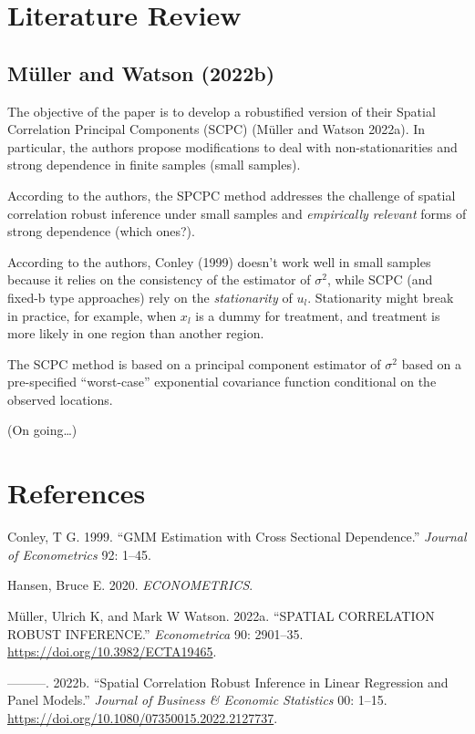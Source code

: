 \documentclass[
]{article}
\newlength{\cslhangindent}
\newlength{\cslentryspacingunit} %
\newenvironment{CSLReferences}[2] %
 {%
  \setlength{\parindent}{0pt}
  \ifodd #1
  \let\oldpar\par
  \def\par{\hangindent=\cslhangindent\oldpar}
  \fi
  \setlength{\parskip}{#2\cslentryspacingunit}
 }%
 {}
\begin{document}
\hypertarget{literature-review}{%
\section{Literature Review}\label{literature-review}}

\hypertarget{muller2022jbes}{%
\subsection{Müller and Watson (2022b)}\label{muller2022jbes}}

The objective of the paper is to develop a robustified version of their
Spatial Correlation Principal Components (SCPC) (Müller and Watson
2022a). In particular, the authors propose modifications to deal with
non-stationarities and strong dependence in finite samples (small
samples).

According to the authors, the SPCPC method addresses the challenge of
spatial correlation robust inference under small samples and
\emph{empirically relevant} forms of strong dependence (which ones?).

According to the authors, Conley (1999) doesn't work well in small
samples because it relies on the consistency of the estimator of
\(\sigma^2\), while SCPC (and fixed-b type approaches) rely on the
\emph{stationarity} of \(u_l\). Stationarity might break in practice,
for example, when \(x_l\) is a dummy for treatment, and treatment is
more likely in one region than another region.

The SCPC method is based on a principal component estimator of
\(\sigma^2\) based on a pre-specified ``worst-case'' exponential
covariance function conditional on the observed locations.

(On going\ldots)

\hypertarget{references}{%
\section*{References}\label{references}}

\hypertarget{refs}{}
\begin{CSLReferences}{1}{0}
\leavevmode{}%
Conley, T G. 1999. {``GMM Estimation with Cross Sectional Dependence.''}
\emph{Journal of Econometrics} 92: 1--45.

\leavevmode{}%
Hansen, Bruce E. 2020. \emph{ECONOMETRICS}.

\leavevmode{}%
Müller, Ulrich K, and Mark W Watson. 2022a. {``SPATIAL CORRELATION
ROBUST INFERENCE.''} \emph{Econometrica} 90: 2901--35.
\url{https://doi.org/10.3982/ECTA19465}.

\leavevmode{}%
---------. 2022b. {``Spatial Correlation Robust Inference in Linear
Regression and Panel Models.''} \emph{Journal of Business \& Economic
Statistics} 00: 1--15.
\url{https://doi.org/10.1080/07350015.2022.2127737}.

\end{CSLReferences}
\end{document}

